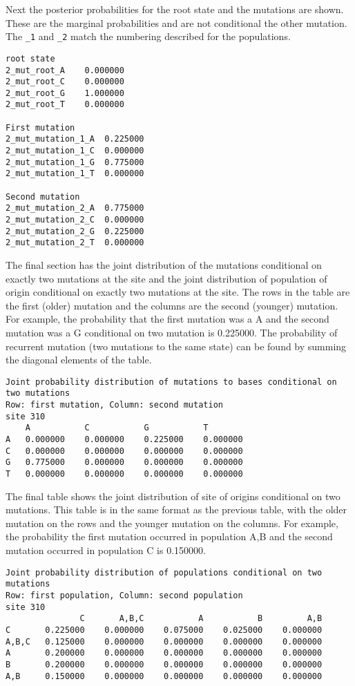 \documentclass[11pt]{article}
\begin{document}
Next the posterior probabilities for the root state and the mutations are shown.
These are the marginal probabilities and are not conditional the other mutation. 
The \texttt{\_1} and \texttt{\_2} match the numbering described for the populations.
\begin{Verbatim}[frame=single, fontsize=\small]
root state
2_mut_root_A	0.000000	
2_mut_root_C	0.000000	
2_mut_root_G	1.000000	
2_mut_root_T	0.000000	

First mutation
2_mut_mutation_1_A	0.225000	
2_mut_mutation_1_C	0.000000	
2_mut_mutation_1_G	0.775000	
2_mut_mutation_1_T	0.000000	

Second mutation
2_mut_mutation_2_A	0.775000	
2_mut_mutation_2_C	0.000000	
2_mut_mutation_2_G	0.225000	
2_mut_mutation_2_T	0.000000
\end{Verbatim}

The final section has the joint distribution of the mutations conditional on exactly two mutations at the site and the joint distribution of population of origin conditional on exactly two mutations at the site.
The rows in the table are the first (older) mutation and the columns are the second (younger) mutation.
For example, the probability that the first mutation was a A and the second mutation was a G conditional on two mutation is 0.225000. 
The probability of recurrent mutation (two mutations to the same state) can be found by summing the diagonal elements of the table.
\begin{Verbatim}[frame=single, fontsize=\small]
Joint probability distribution of mutations to bases conditional on two mutations
Row: first mutation, Column: second mutation
site 310
	A       	C       	G       	T
A	0.000000	0.000000	0.225000	0.000000	
C	0.000000	0.000000	0.000000	0.000000	
G	0.775000	0.000000	0.000000	0.000000	
T	0.000000	0.000000	0.000000	0.000000	
\end{Verbatim}

The final table shows the joint distribution of site of origins conditional on two mutations.
This table is in the same format as the previous table, with the older mutation on the rows and the younger mutation on the columns. 
For example, the probability the first mutation occurred in population A,B and the second mutation occurred in population C is 0.150000. 
\begin{Verbatim}[frame=single, fontsize=\small]
Joint probability distribution of populations conditional on two mutations
Row: first population, Column: second population
site 310
     	       C	   A,B,C	       A	       B	     A,B
C    	0.225000	0.000000	0.075000	0.025000	0.000000	
A,B,C	0.125000	0.000000	0.000000	0.000000	0.000000	
A    	0.200000	0.000000	0.000000	0.000000	0.000000	
B    	0.200000	0.000000	0.000000	0.000000	0.000000	
A,B  	0.150000	0.000000	0.000000	0.000000	0.000000	
\end{Verbatim}
\end{document}
